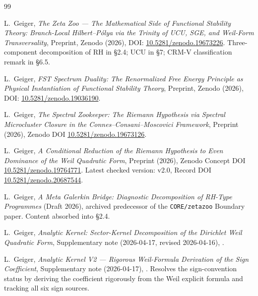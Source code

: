 \documentclass[a4paper,10pt,twocolumn]{article}
\theoremstyle{definition}
\theoremstyle{remark}
\begin{document}
\begin{thebibliography}{99}


L.~Geiger,
\textit{The Zeta Zoo --- The Mathematical Side of Functional
Stability Theory: Branch-Local Hilbert--P\'olya via the Trinity of
UCU, SGE, and Weil-Form Transversality},
Preprint, Zenodo (2026), DOI:
\href{https://doi.org/10.5281/zenodo.19673226}{10.5281/zenodo.19673226}.
Three-component decomposition of $\mathrm{RH}$ in \S2.4; UCU in \S7;
CRM-V classification remark in \S6.5.

L.~Geiger,
\textit{FST Spectrum Duality: The Renormalized Free Energy Principle
as Physical Instantiation of Functional Stability Theory},
Preprint, Zenodo (2026), DOI:
\href{https://doi.org/10.5281/zenodo.19036190}{10.5281/zenodo.19036190}.

L.~Geiger,
\textit{The Spectral Zookeeper: The Riemann Hypothesis via Spectral
Microcluster Closure in the Connes--Consani--Moscovici Framework},
Preprint (2026), Zenodo DOI
\href{https://doi.org/10.5281/zenodo.19673126}{10.5281/zenodo.19673126}.


L.~Geiger,
\textit{A Conditional Reduction of the Riemann Hypothesis to Even
Dominance of the Weil Quadratic Form},
Preprint (2026), Zenodo Concept DOI
\href{https://doi.org/10.5281/zenodo.19764771}{10.5281/zenodo.19764771}.
Latest checked version: v2.0, Record DOI
\href{https://doi.org/10.5281/zenodo.20687544}{10.5281/zenodo.20687544}.

L.~Geiger,
\textit{A Meta Galerkin Bridge: Diagnostic Decomposition of RH-Type
Programmes}
(Draft 2026), archived predecessor of the \texttt{CORE/zetazoo}
Boundary paper. Content absorbed into \cite{MathMaster} \S2.4.

L.~Geiger,
\textit{Analytic Kernel: Sector-Kernel Decomposition of the
Dirichlet Weil Quadratic Form},
Supplementary note (2026-04-17, revised 2026-04-16),
.

L.~Geiger,
\textit{Analytic Kernel V2 --- Rigorous Weil-Formula Derivation
of the Sign Coefficient},
Supplementary note (2026-04-17),
.
Resolves the sign-convention status by deriving the coefficient
rigorously from the Weil explicit formula and tracking all six sign
sources.


\end{thebibliography}
\end{document}
